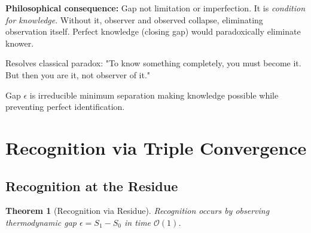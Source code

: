 \documentclass[twocolumn,10pt]{revtex4-2}
\newtheorem{theorem}{Theorem}[section]
\theoremstyle{definition}
\theoremstyle{remark}
\newcommand{\bigO}{\mathcal{O}}
\begin{document}
\vspace{0.2cm}
\noindent\textbf{Philosophical consequence:} Gap not limitation or imperfection. It is \textit{condition for knowledge}. Without it, observer and observed collapse, eliminating observation itself. Perfect knowledge (closing gap) would paradoxically eliminate knower.

Resolves classical paradox: "To know something completely, you must become it. But then you are it, not observer of it."

Gap $\epsilon$ is irreducible minimum separation making knowledge possible while preventing perfect identification.

\section{Recognition via Triple Convergence}
\label{sec:triple_convergence}

\subsection{Recognition at the Residue}

\begin{theorem}[Recognition via Residue]
\label{thm:recognition_residue}
Recognition occurs by observing thermodynamic gap $\epsilon = S_1 - S_0$ in time $\bigO(1)$.
\end{theorem}
\end{document}
